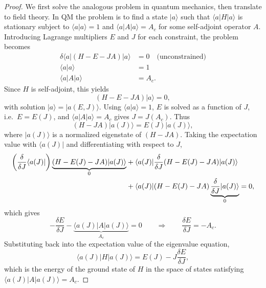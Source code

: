 \begin{proof}
	We first solve the analogous problem in quantum mechanics, then translate
	to field theory. In QM the problem is to find a state $|a\rangle$ such
	that $\langle a|H|a\rangle$ is stationary subject to $\langle a|a\rangle
		= 1$ and $\langle a|A|a\rangle = A_c$ for some self-adjoint operator $A$.
	Introducing Lagrange multipliers $E$ and $J$ for each constraint, the
	problem becomes
	\begin{align}
		\delta\langle a|(H - E - JA)|a\rangle & = 0 \quad \text{(unconstrained)} \\
		\langle a|a\rangle                    & = 1                              \\
		\langle a|A|a\rangle                  & = A_c.
	\end{align}
	Since $H$ is self-adjoint, this yields
	\begin{equation}
		(H - E - JA)|a\rangle = 0,
	\end{equation}
	with solution $|a\rangle = |a(E,J)\rangle$. Using $\langle a|a\rangle=1$,
	$E$ is solved as a function of $J$, i.e.\ $E = E(J)$, and
	$\langle a|A|a\rangle = A_c$ gives $J = J(A_c)$. Thus
	\begin{equation}
		(H - JA)|a(J)\rangle = E(J)|a(J)\rangle,
	\end{equation}
	where $|a(J)\rangle$ is a normalized eigenstate of $(H-JA)$. Taking the
	expectation value with $\langle a(J)|$ and differentiating with respect
	to $J$,
	\begin{align}
		\left(\frac{\delta}{\delta J}\langle a(J)|\right)
		\underbrace{(H-E(J)-JA)|a(J)\rangle}_{0}
		 & + \langle a(J)|\frac{\delta}{\delta J}
		(H - E(J) - JA)|a(J)\rangle \notag        \\
		 & + \langle a(J)|(H-E(J)-JA)
		\underbrace{\frac{\delta}{\delta J}|a(J)\rangle}_{0} = 0,
	\end{align}
	which gives
	\begin{equation}
		-\frac{\delta E}{\delta J} -
		\underbrace{\langle a(J)|A|a(J)\rangle}_{A_c} = 0
		\qquad \Rightarrow \qquad
		\frac{\delta E}{\delta J} = -A_c.
	\end{equation}
	Substituting back into the expectation value of the eigenvalue equation,
	\begin{equation}
		\langle a(J)|H|a(J)\rangle = E(J) - J\frac{\delta E}{\delta J},
	\end{equation}
	which is the energy of the ground state of $H$ in the space of states
	satisfying $\langle a(J)|A|a(J)\rangle = A_c$.


\end{proof}

